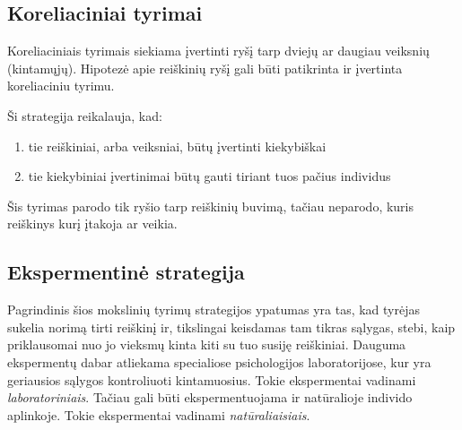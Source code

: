\subsection{Koreliaciniai tyrimai}

Koreliaciniais tyrimais siekiama įvertinti ryšį tarp dviejų ar daugiau 
veiksnių (kintamųjų). Hipotezė apie reiškinių ryšį gali būti patikrinta ir 
įvertinta koreliaciniu tyrimu. 

Ši strategija reikalauja, kad: 
\begin{enumerate}
  \item tie reiškiniai, arba veiksniai, būtų įvertinti kiekybiškai
  \item tie kiekybiniai įvertinimai būtų gauti tiriant tuos pačius individus
\end{enumerate}

Šis tyrimas parodo tik ryšio tarp reiškinių buvimą, tačiau neparodo, kuris
reiškinys kurį įtakoja ar veikia. 

\subsection{Ekspermentinė strategija}

Pagrindinis šios mokslinių tyrimų strategijos ypatumas yra tas, kad tyrėjas 
sukelia norimą tirti reiškinį ir, tikslingai keisdamas tam tikras sąlygas, 
stebi, kaip priklausomai nuo jo vieksmų kinta kiti su tuo susiję reiškiniai.
Dauguma ekspermentų dabar atliekama specialiose psichologijos laboratorijose,
kur yra geriausios sąlygos kontroliuoti kintamuosius. Tokie ekspermentai 
vadinami \emph{laboratoriniais}. Tačiau gali būti ekspermentuojama ir 
natūralioje individo aplinkoje. Tokie ekspermentai vadinami 
\emph{natūraliaisiais}.